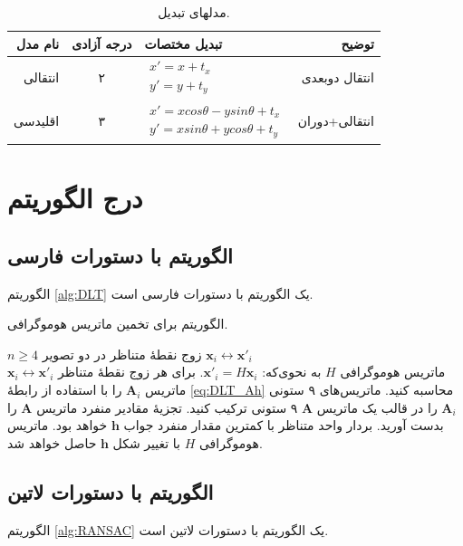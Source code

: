 \begin{table}[ht]
\caption{مدلهای تبدیل.}
\label{tab:MotionModels}
\centering
\onehalfspacing
\begin{tabular}{|r|c|l|r|}
\hline نام مدل & درجه آزادی & تبدیل مختصات & توضیح \\ 
\hline انتقالی & ۲ & $\begin{aligned} x'=x+t_x \\ y'=y+t_y \end{aligned}$  &  انتقال دوبعدی\\ 
\hline اقلیدسی & ۳ & $\begin{aligned} x'=xcos\theta - ysin\theta+t_x \\ y'=xsin\theta+ycos\theta+t_y \end{aligned}$  &  انتقالی+دوران \\ 
\hline 
\end{tabular} 
\end{table}




\section{درج الگوریتم}
\subsection{الگوریتم با دستورات فارسی}
 الگوریتم 
 \eqref{alg:DLT} 
 یک الگوریتم با دستورات فارسی است.
\begin{algorithm}[t]
\onehalfspacing
\caption{الگوریتم  برای تخمین ماتریس هوموگرافی.} \label{alg:DLT}
\begin{algorithmic}[1]
\REQUIRE $n\geq4$ زوج نقطهٔ متناظر در دو تصویر 
${\mathbf{x}_i\leftrightarrow\mathbf{x}'_i}$
\\
\ENSURE ماتریس هوموگرافی $H$ به نحوی‌که: 
$\mathbf{x}'_i = H \mathbf{x}_i$.
  \STATE برای هر زوج نقطهٔ متناظر
$\mathbf{x}_i\leftrightarrow\mathbf{x}'_i$ 
ماتریس $\mathbf{A}_i$ را با استفاده از رابطهٔ \ref{eq:DLT_Ah} محاسبه کنید.
  \STATE ماتریس‌های ۹ ستونی  $\mathbf{A}_i$ را در قالب یک ماتریس $\mathbf{A}$ ۹ ستونی ترکیب کنید. 
  \STATE تجزیهٔ مقادیر منفرد   ماتریس $\mathbf{A}$ را بدست آورید. بردار واحد متناظر با کمترین مقدار منفرد جواب $\mathbf{h}$ خواهد بود.
  \STATE  ماتریس هوموگرافی $H$ با تغییر شکل $\mathbf{h}$ حاصل خواهد شد.
\end{algorithmic}
\end{algorithm}

\subsection{الگوریتم با دستورات لاتین}
الگوریتم
 \ref{alg:RANSAC}
  یک الگوریتم با دستورات لاتین است.

